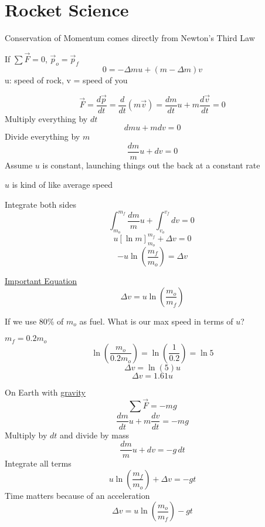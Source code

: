 \documentclass[fleqn]{article}
\begin{document}
\setlength{\mathindent}{0pt}
\section*{Rocket Science}
Conservation of Momentum comes directly from Newton's Third Law

If $\sum \vec{F} = 0 $, $\vec{p}_{o} = \vec{p}_{f}$
\[ 0=-\Delta mu + (m-\Delta m)v\]
u: speed of rock, v = speed of you

\[ \vec{F} = \frac{d \vec{p} }{dt}  = \frac{d}{dt} \left( m \vec{v}  \right)= \frac{dm}{dt}u+m \frac{d \vec{v} }{dt}=0 \]
Multiply everything by $dt$
\[ dmu + mdv = 0 \]
Divide everything by $m$
\[ \frac{dm}{m} u+dv=0 \]
Assume $u$ is constant, launching things out the back at a constant rate

$u$ is kind of like average speed

Integrate both sides
\[ \int_{m_o}^{m_f} \frac{dm}{m} u + \int_{v_o}^{v_f} dv=0\ \]
\[ u \left[ \ln m \right]^{m_f}_{m_o}   + \Delta v=0 \]
\[ -u \ln \left( \frac{m_f}{m_o}  \right) = \Delta v\]

\underline{Important Equation}
\[ \Delta v = u \ln \left( \frac{m_o}{m_f}  \right) \]

If we use 80\% of $m_o$ as fuel. What is our max speed in terms of $u$?

$m_f = 0.2m_o$
\[ \ln \left( \frac{m_o}{0.2m_o}  \right) = \ln \left( \frac{1}{0.2}\right) = \ln 5 \]
\[ \Delta v= \ln \left(5\right) u\]
\[ \Delta v = 1.61 u \]

On Earth with \underline{gravity}
\[ \sum \vec{F} = -mg\]
\[ \frac{dm}{dt} u + m \frac{dv}{dt} = -mg \]
Multiply by $dt$ and divide by mass
\[ \frac{dm}{m} u + dv = -g\, dt \]
Integrate all terms
\[ u \ln \left( \frac{m_f}{m_o}  \right) + \Delta v =-gt\]
Time matters because of an acceleration
\[ \Delta v= u \ln \left( \frac{m_o}{m_f}  \right) - gt \]
\end{document}
